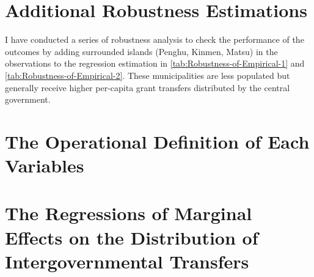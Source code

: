


\section{\centering Additional Robustness Estimations}\label{sec:robustness}
I have conducted a series of robustness analysis to check the performance of the outcomes by adding surrounded islands (Penghu, Kinmen, Matsu) in the observations to the regression estimation in \autoref{tab:Robustness-of-Empirical-1} and \autoref{tab:Robustness-of-Empirical-2}. These municipalities are less populated but generally receive higher per-capita grant transfers distributed by the central government.


\newpage


\clearpage


\section{\centering The Operational Definition of Each Variables\label{sec:variable}}



\clearpage

\section{\centering  The Regressions of Marginal Effects on the  Distribution of Intergovernmental Transfers \label{sec:margin-model}}


